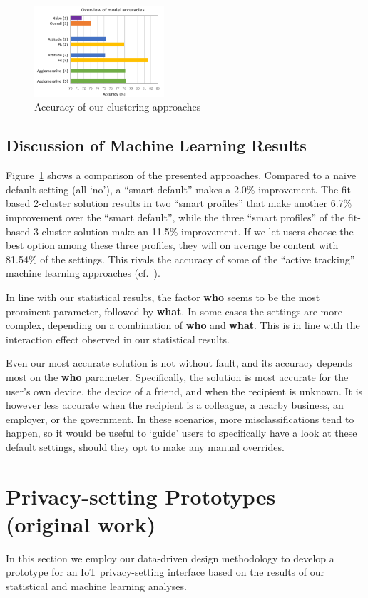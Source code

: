 \begin{figure}[t]
	\centering
	\includegraphics[width=0.43\textwidth]{figures/compare.pdf}
	\caption{Accuracy of our clustering approaches}
	\label{fig:comp_approach}
\end{figure}

\subsection{Discussion of Machine Learning Results}
Figure~\ref{fig:comp_approach} shows a comparison of the presented approaches. Compared to a naive default setting (all `no'), a ``smart default'' makes a 2.0\% improvement. The fit-based 2-cluster solution results in two ``smart profiles'' that make another 6.7\% improvement over the ``smart default'', while the three ``smart profiles'' of the fit-based 3-cluster solution make an 11.5\% improvement. If we let users choose the best option among these three profiles, they will on average be content with 81.54\% of the settings. This rivals the accuracy of some of the ``active tracking'' machine learning approaches (cf.~\cite{sadeh2009understanding}).

In line with our statistical results, the factor \textbf{who} seems to be the most prominent parameter, followed by \textbf{what}. In some cases the settings are more complex, depending on a combination of \textbf{who} and \textbf{what}. This is in line with the interaction effect observed in our statistical results.

Even our most accurate solution is not without fault, and its accuracy depends most on the \textbf{who} parameter. Specifically, the solution is most accurate for the user's own device, the device of a friend, and when the recipient is unknown. It is however less accurate when the recipient is a colleague, a nearby business, an employer, or the government. In these scenarios, more misclassifications tend to happen, so it would be useful to `guide' users to specifically have a look at these default settings, should they opt to make any manual overrides.

\section{Privacy-setting Prototypes (original work)}\label{sec:design1}
In this section we employ our data-driven design methodology to develop a prototype for an IoT privacy-setting interface based on the results of our statistical and machine learning analyses.

